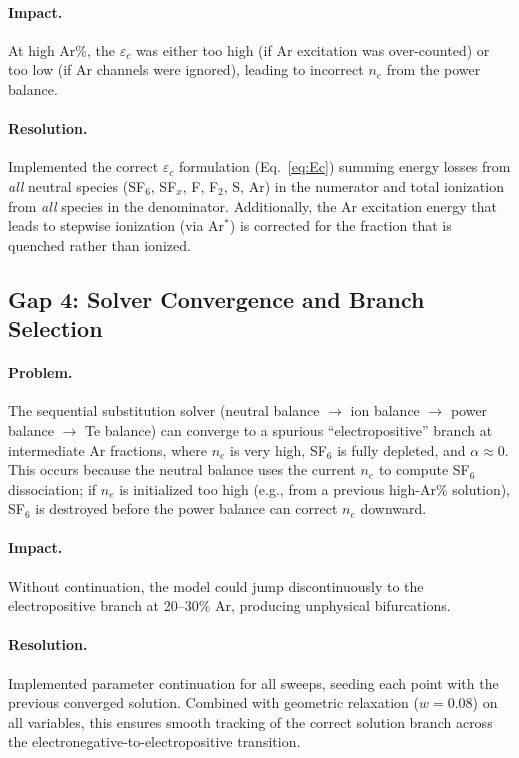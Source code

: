 \documentclass[11pt,a4paper]{article}
\newcommand{\nelec}{n_e}
\begin{document}
\paragraph{Impact.} At high Ar\%, the $\varepsilon_c$ was either too high (if Ar excitation was over-counted) or too low (if Ar channels were ignored), leading to incorrect $\nelec$ from the power balance.

\paragraph{Resolution.} Implemented the correct $\varepsilon_c$ formulation (Eq.~\ref{eq:Ec}) summing energy losses from \emph{all} neutral species (SF$_6$, SF$_x$, F, F$_2$, S, Ar) in the numerator and total ionization from \emph{all} species in the denominator.  Additionally, the Ar excitation energy that leads to stepwise ionization (via Ar$^*$) is corrected for the fraction that is quenched rather than ionized.

\subsection{Gap 4: Solver Convergence and Branch Selection}

\paragraph{Problem.} The sequential substitution solver (neutral balance $\to$ ion balance $\to$ power balance $\to$ Te balance) can converge to a spurious ``electropositive'' branch at intermediate Ar fractions, where $\nelec$ is very high, SF$_6$ is fully depleted, and $\alpha \approx 0$.  This occurs because the neutral balance uses the current $\nelec$ to compute SF$_6$ dissociation; if $\nelec$ is initialized too high (e.g., from a previous high-Ar\% solution), SF$_6$ is destroyed before the power balance can correct $\nelec$ downward.

\paragraph{Impact.} Without continuation, the model could jump discontinuously to the electropositive branch at 20--30\% Ar, producing unphysical bifurcations.

\paragraph{Resolution.} Implemented parameter continuation for all sweeps, seeding each point with the previous converged solution.  Combined with geometric relaxation ($w = 0.08$) on all variables, this ensures smooth tracking of the correct solution branch across the electronegative-to-electropositive transition.
\end{document}
